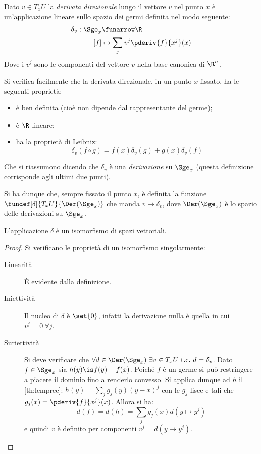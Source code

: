\begin{defn}
	Dato $v\in T_x U$ la \emph{derivata direzionale} lungo il vettore $v$ nel punto $x$
	è un'applicazione lineare sullo spazio dei germi definita nel modo seguente:
	\begin{align*}
		\delta_v: \Sge_x &\funarrow \R \\
		[f] &\mapsto \sum_j v^j \pderiv{f}{x^j}(x)
	\end{align*}
	Dove i $v^j$ sono le componenti del vettore $v$ nella base canonica di $\R ^n$.
\end{defn}

\begin{oss}
	Si verifica facilmente che la derivata direzionale, in un punto $x$ fissato, ha le seguenti proprietà:
	\begin{itemize}
		\item è ben definita (cioè non dipende dal rappresentante del germe);
		\item è $\R$-lineare;
		\item
			ha la proprietà di Leibniz:
			\[ \delta_v(f\circ g) = f(x)\delta_v(g) + g(x)\delta_v(f) \]
	\end{itemize}
	Che si riassumono dicendo che $\delta_v$ è una \emph{derivazione} su $\Sge_x$ (questa definizione corrisponde agli ultimi due punti).
\end{oss}

Si ha dunque che, sempre fissato il punto $x$, è definita la funzione $\fundef[\delta]{T_x U}{\Der(\Sge_x)}$ che manda $v\mapsto\delta_v$, dove $\Der(\Sge_x)$ è lo spazio delle derivazioni su $\Sge_x$.

\begin{lemma}
L'applicazione $\delta$ è un isomorfismo di spazi vettoriali.
\end{lemma}
\begin{proof}
Si verificano le proprietà di un isomorfismo singolarmente:
\begin{description}
\item[Linearità] È evidente dalla definizione.
\item[Iniettività] Il nucleo di $\delta$ è $\set{0}$, infatti la derivazione nulla è quella in cui $v^j = 0~ \forall j$.
\item[Suriettività] Si deve verificare che $\forall d\in \Der(\Sge_x)\ \exists v\in T_x U\ \text{t.c.}\ d = \delta_v$. Dato $f\in \Sge_x$ sia $h(y) \is f(y) -f(x)$. Poiché $f$ è un germe si può restringere a piacere il dominio fino a renderlo convesso. Si applica dunque ad $h$ il \autoref{th:lemprec}: $h(y) = \sum_j g_j(y)(y-x)^j$ con le $g_j$ lisce e tali che $g_j(x) = \pderiv{f}{x^j}(x)$. Allora si ha:
\begin{equation*}
d(f) = d(h) = \sum_jg_j(x)d(y\mapsto y^j) 
\end{equation*}
e quindi $v$ è definito per componenti $v^j = d(y\mapsto y^j)$.
\qedhere
\end{description}
\end{proof}

